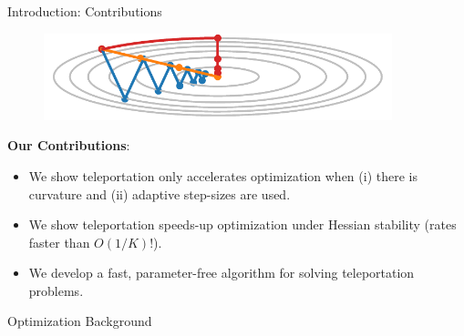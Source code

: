 \documentclass[usenames,dvipsnames,mathserif,notheorems]{beamer}
\newcommand{\bad}[1]{\textcolor{bad}{#1}}
\newcommand{\good}[1]{\textcolor{good}{#1}}
\begin{document}
\begin{frame}{Introduction: Contributions}
    \begin{figure}[]
        \centering
        \includegraphics[width=0.9\textwidth]{assets/GD_combined.pdf}
    \end{figure}

    \textbf{Our Contributions}:
    \pause
    \begin{itemize}
        \item We show teleportation only accelerates optimization when (i)
              there is \bad{curvature} and (ii) \bad{adaptive step-sizes} are
              used.
              \pause
              \vspace{1ex}

        \item We show teleportation \good{speeds-up} optimization under Hessian
              stability (rates faster than \( O(1/K) \)!).
              \pause
              \vspace{1ex}

        \item We develop a \good{fast, parameter-free} algorithm for solving
              teleportation problems.
    \end{itemize}

\end{frame}

\begin{frame}{}
    \begin{center}
        \huge Optimization Background
    \end{center}
\end{frame}
\end{document}
